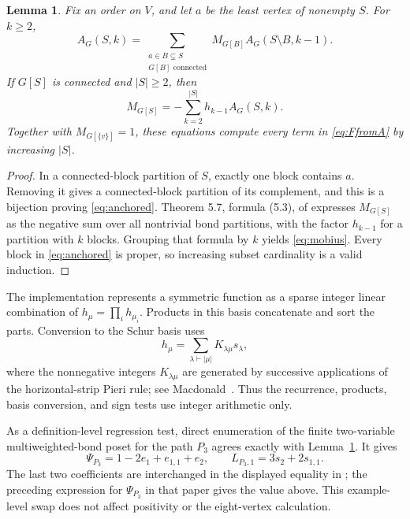 \documentclass[11pt]{article}
\newtheorem{lemma}[theorem]{Lemma}
\begin{document}
\begin{lemma}\label{lem:recurrence}
Fix an order on $V$, and let $a$ be the least vertex of nonempty $S$.  For
$k\geq2$,
\begin{equation}\label{eq:anchored}
 A_G(S,k)=
 \sum_{\substack{a\in B\subsetneq S\\G[B]\text{ connected}}}
 M_{G[B]}A_G(S\setminus B,k-1).
\end{equation}
If $G[S]$ is connected and $|S|\geq2$, then
\begin{equation}\label{eq:mobius}
 M_{G[S]}=-\sum_{k=2}^{|S|}h_{k-1}A_G(S,k).
\end{equation}
Together with $M_{G[\{v\}]}=1$, these equations compute every term in
\eqref{eq:FfromA} by increasing $|S|$.
\end{lemma}

\begin{proof}
In a connected-block partition of $S$, exactly one block contains $a$.
Removing it gives a connected-block partition of its complement, and this is
a bijection proving \eqref{eq:anchored}.  Theorem 5.7, formula (5.3), of
\cite{gonzalez-wachs2026} expresses $M_{G[S]}$ as the negative sum over all
nontrivial bond partitions, with the factor $h_{k-1}$ for a partition with
$k$ blocks.  Grouping that formula by $k$ yields \eqref{eq:mobius}.  Every
block in \eqref{eq:anchored} is proper, so increasing subset cardinality is a
valid induction.
\end{proof}

The implementation represents a symmetric function as a sparse integer
linear combination of $h_\mu=\prod_i h_{\mu_i}$.  Products in this basis
concatenate and sort the parts.  Conversion to the Schur basis uses
\begin{equation}\label{eq:kostka}
  h_\mu=\sum_{\lambda\vdash |\mu|}K_{\lambda\mu}s_\lambda,
\end{equation}
where the nonnegative integers $K_{\lambda\mu}$ are generated by successive
applications of the horizontal-strip Pieri rule; see
Macdonald~\cite[Chapter~I]{macdonald1995}.  Thus the recurrence, products,
basis conversion, and sign tests use integer arithmetic only.

As a definition-level regression test, direct enumeration of the finite
two-variable multiweighted-bond poset for the path $P_3$ agrees exactly with
Lemma~\ref{lem:recurrence}.  It gives
\[
 \Psi_{P_3}=1-2e_1+e_{1,1}+e_2,
 \qquad L_{P_3,1}=3s_2+2s_{1,1}.
\]
The last two coefficients are interchanged in the displayed equality in
\cite[Example~7.4]{gonzalez-wachs2026}; the preceding expression for
$\Psi_{P_3}$ in that paper gives the value above.  This example-level swap
does not affect positivity or the eight-vertex calculation.
\end{document}
